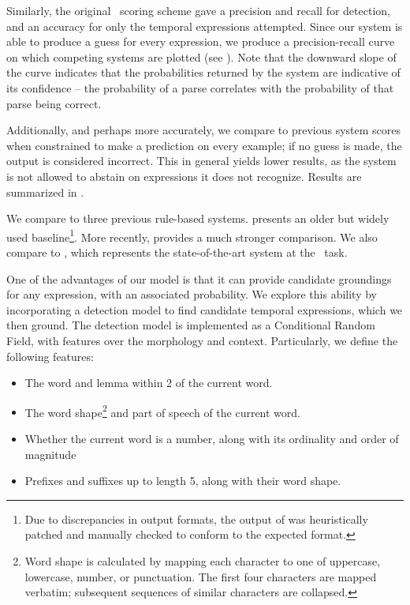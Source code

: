
Similarly, the original \tempeval\ scoring scheme gave a precision 
	and recall for detection, and an accuracy for only the temporal expressions 
	attempted.
Since our system is able to produce a guess for every expression, we produce
	a precision-recall curve on which competing systems are plotted
	(see ).
Note that the downward slope of the curve indicates that the probabilities
	returned by the system are indicative of its confidence -- the probability
	of a parse correlates with the probability of that parse being correct.

Additionally, and perhaps more accurately, we compare to 
	previous system scores when constrained to make a prediction on every
	example; if no guess is made, the output is considered incorrect.
This in general yields lower results, as the system is not allowed to
	abstain on expressions it does not recognize.
Results are summarized in .

We compare to three previous rule-based systems.
 \cite{key:2000mani-temporal} presents an older but widely
	used baseline\footnote{
		Due to discrepancies in output formats, 
			the output of  was heuristically patched
			and manually checked to conform to the expected format.
	}.
More recently,  \cite{key:2012chang-temporal} 
	provides a much stronger comparison.
We also compare to  \cite{key:2010strotgen-temporal}, 
	which represents the state-of-the-art system at the \tempeval\ task.

One of the advantages of our model is that it can provide candidate groundings for any
	expression, with an associated probability.
We explore this ability by incorporating a detection model to find candidate temporal
	expressions, which we then ground.
The detection model is implemented as a Conditional Random Field, with features over the
	morphology and context.
Particularly, we define the following features:
\begin{itemize}
\item The word and lemma within 2 of the current word.
\item The word shape\footnote{
		Word shape is calculated by mapping each character to one of uppercase, lowercase, number,
			or punctuation.
		The first four characters are mapped verbatim; subsequent sequences of similar characters
			are collapsed.
	}
	and part of speech of the current word.
\item Whether the current word is a number, along with its ordinality and order of magnitude
\item Prefixes and suffixes up to length 5, along with their word shape.
\end{itemize}

